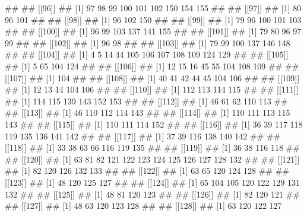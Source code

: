 \documentclass[11pt,]{article}
\newenvironment{Shaded}{\begin{snugshade}}{\end{snugshade}}
\newcommand{\NormalTok}[1]{#1}
\begin{document}
\begin{Shaded}
\begin{Highlighting}[]
\NormalTok{## }
\NormalTok{## [[96]]}
\NormalTok{## [1]  97  98  99 100 101 102 150 154 155}
\NormalTok{## }
\NormalTok{## [[97]]}
\NormalTok{## [1]  80  96 101}
\NormalTok{## }
\NormalTok{## [[98]]}
\NormalTok{## [1]  96 102 150}
\NormalTok{## }
\NormalTok{## [[99]]}
\NormalTok{## [1]  79  96 100 101 103}
\NormalTok{## }
\NormalTok{## [[100]]}
\NormalTok{## [1]  96  99 103 137 141 155}
\NormalTok{## }
\NormalTok{## [[101]]}
\NormalTok{## [1] 79 80 96 97 99}
\NormalTok{## }
\NormalTok{## [[102]]}
\NormalTok{## [1] 96 98}
\NormalTok{## }
\NormalTok{## [[103]]}
\NormalTok{## [1]  79  99 100 137 146 148}
\NormalTok{## }
\NormalTok{## [[104]]}
\NormalTok{##  [1]   4   5  14  44 105 106 107 108 109 124 129}
\NormalTok{## }
\NormalTok{## [[105]]}
\NormalTok{## [1]   5  65 104 124}
\NormalTok{## }
\NormalTok{## [[106]]}
\NormalTok{## [1]  12  15  16  45  55 104 108 109}
\NormalTok{## }
\NormalTok{## [[107]]}
\NormalTok{## [1] 104}
\NormalTok{## }
\NormalTok{## [[108]]}
\NormalTok{## [1]  40  41  42  44  45 104 106}
\NormalTok{## }
\NormalTok{## [[109]]}
\NormalTok{## [1]  12  13  14 104 106}
\NormalTok{## }
\NormalTok{## [[110]]}
\NormalTok{## [1] 112 113 114 115}
\NormalTok{## }
\NormalTok{## [[111]]}
\NormalTok{## [1] 114 115 139 143 152 153}
\NormalTok{## }
\NormalTok{## [[112]]}
\NormalTok{## [1]  46  61  62 110 113}
\NormalTok{## }
\NormalTok{## [[113]]}
\NormalTok{## [1]  46 110 112 114 143}
\NormalTok{## }
\NormalTok{## [[114]]}
\NormalTok{## [1] 110 111 113 115 143}
\NormalTok{## }
\NormalTok{## [[115]]}
\NormalTok{## [1] 110 111 114 152}
\NormalTok{## }
\NormalTok{## [[116]]}
\NormalTok{## [1]  36  39 117 118 119 135 136 141 142}
\NormalTok{## }
\NormalTok{## [[117]]}
\NormalTok{## [1]  37  39 116 138 140 142}
\NormalTok{## }
\NormalTok{## [[118]]}
\NormalTok{## [1]  33  38  63  66 116 119 135}
\NormalTok{## }
\NormalTok{## [[119]]}
\NormalTok{## [1]  36  38 116 118}
\NormalTok{## }
\NormalTok{## [[120]]}
\NormalTok{##  [1]  63  81  82 121 122 123 124 125 126 127 128 132}
\NormalTok{## }
\NormalTok{## [[121]]}
\NormalTok{## [1]  82 120 126 132 133}
\NormalTok{## }
\NormalTok{## [[122]]}
\NormalTok{## [1]  63  65 120 124 128}
\NormalTok{## }
\NormalTok{## [[123]]}
\NormalTok{## [1]  48 120 125 127}
\NormalTok{## }
\NormalTok{## [[124]]}
\NormalTok{## [1]  65 104 105 120 122 129 131 132}
\NormalTok{## }
\NormalTok{## [[125]]}
\NormalTok{## [1]  48  81 120 123}
\NormalTok{## }
\NormalTok{## [[126]]}
\NormalTok{## [1]  82 120 121}
\NormalTok{## }
\NormalTok{## [[127]]}
\NormalTok{## [1]  48  63 120 123 128}
\NormalTok{## }
\NormalTok{## [[128]]}
\NormalTok{## [1]  63 120 122 127}

\end{Highlighting}
\end{Shaded}
\end{document}
